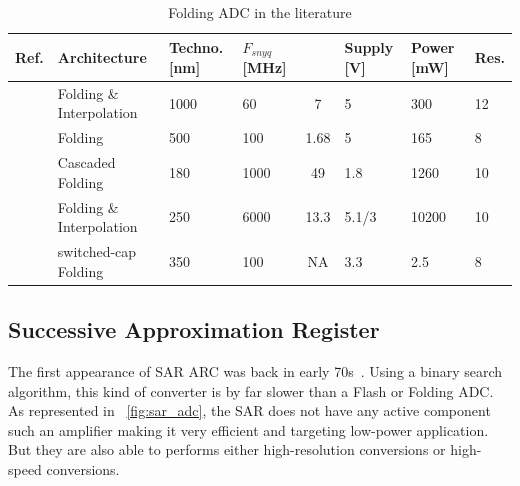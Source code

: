 \begin{table}[htp]
	\caption{Folding ADC in the literature}
	\centering
	\label{table:folding_comparison_table}
	\begin{tabular}{L{3.5\charwidth} C{23\charwidth} R{6.5\charwidth} R{4\charwidth} S[table-format=2.2, table-column-width=5.2\charwidth] R{6\charwidth} R{5.5\charwidth} R{3.5\charwidth}}
		\toprule
	Ref. & Architecture & Techno. [nm] & \(F_{snyq}\) [MHz] & {} & Supply [V] & Power [mW] & Res. \tabularnewline \midrule
	\cite{Vorenkamp1997} & Folding \& Interpolation  & 1000 &   60 &    7 &   5 &  300 & 12 \\
	\cite{Choe2001}      & Folding                   &  500 &  100 & 1.68 &   5 &  165 &  8 \\
	\cite{Taft2009}      & Cascaded Folding          &  180 & 1000 &   49 & 1.8 & 1260 & 10 \\
	\cite{Buck2017}      & Folding \& Interpolation  &  250 & 6000 & 13.3 & 5.1/3 & 10200 & 10 \\
	\cite{Costa2013}     & switched-cap Folding      &  350 &  100 &   NA & 3.3 &  2.5 &  8 \\
	\bottomrule
	\end{tabular}
\end{table}

\subsection{Successive Approximation Register} %
\label{sec:sar-adc}
The first appearance of SAR ARC was back in early 70s~\cite{McCreary1975}. Using a binary search algorithm, this kind of converter is by far slower than a Flash or Folding ADC\@. As represented in \figurename~\ref{fig:sar_adc}, the SAR does not have any active component such an amplifier making it very efficient and targeting low-power application. But they are also able to performs either high-resolution conversions or high-speed conversions.

